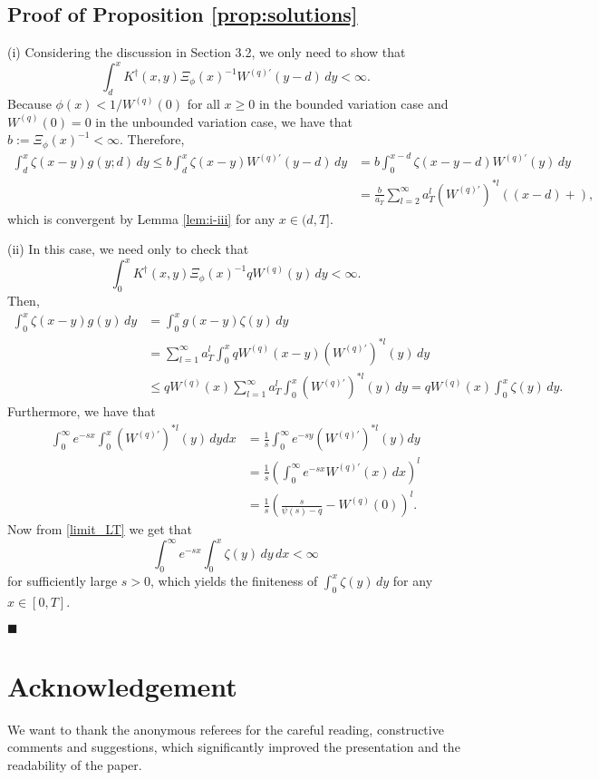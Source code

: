 \documentclass[12pt,reqno]{amsart}
\newcommand{\blue}{\textcolor[rgb]{0.00,0.00,1.00}}
\newcommand{\green}{\textcolor[rgb]{0.00,0.70,.30}}
\theoremstyle{definition}
\theoremstyle{remark}
\begin{document}
\subsection{Proof of Proposition \ref{prop:solutions}}
(i)
Considering the discussion in Section 3.2, we only need to show that$$\int_d^xK^{\dagger}(x,y)\Xi_{\phi}(x)^{-1}W^{(q)\prime}(y-d)\,dy<\infty.$$ 
Because $\phi(x)<1/W^{(q)}(0)$ for all $x\geq0$ in the bounded variation case and $W^{(q)}(0)=0$ in the unbounded variation case, 
we have that $b:=\Xi_{\phi}(x)^{-1}<\infty$. Therefore,
\begin{align*}
\int_d^x \zeta(x-y)g(y;d)\,dy\le b \int_d^x\zeta(x-y){W^{(q)\prime}}(y-d)\,dy&=b\int_0^{x-d}\zeta(x-y-d){W^{(q)\prime}}(y)\,dy\\
&=\frac{b}{a_T}\sum_{l=2}^\infty 
a_T^l(W^{(q)\prime})^{*l}((x-d)+),
\end{align*}
which is convergent by Lemma \ref{lem:i-iii} for any $x\in(d,T]$.\\
\begin{comment}
In the bounded variation case, since $\phi(0+)=0$ {$\phi(x)<1/W^{(q)}(0)$ for all $x>0$?} we have that
$\sup_{y\in [0,T]}\frac{1}{(1-\phi(M)W^{(q)}(0))}=b<\infty$  and therefore 
 $\int_0^x \zeta(x-y)g({y})\,dy\le \int_0^x\zeta(x-y)b{W^{(q)\prime}}(y)\,dy={\frac{b}{a}}\sum_{l=2}^\infty 
a^l(W^{(q)\prime})^{*l}(x)$, where $a$ is defined in \eqref{eq:def_a}, {which is convergent by Lemma
\ref{lem:i-iii}.}
The case of unbounded variation can be treated similarly, since $W^{(q)}(0)=0$.\\
\end{comment}
(ii) In this case, we need only to check that $$\int_0^xK^{\dagger}(x,y)\Xi_{\phi}(x)^{-1}qW^{(q)}(y)\,dy<\infty.$$ 
Then,
\begin{align*}
\int_0^x \zeta(x-y)g(y)\,dy&=\int_0^x g(x-y)\zeta(y)\,dy\\
&=\sum_{l=1}^\infty a_T^l\int_0^x q W^{(q)}(x-y) {(W^{(q)\prime})^{*l}}(y)\,dy 
\\
&\le qW^{(q)}(x)\sum_{l=1}^\infty a_T^l\int_0^x  {(W^{(q)\prime})^{*l}}(y)\,dy=  qW^{(q)}(x)\int_0^x \zeta(y)\,dy.
\end{align*}
Furthermore, we have that
\begin{align*}
\int_0^{\infty}e^{-s x}\int_0^x{(W^{(q)\prime})^{*l}}(y)\,dydx&=\frac{1}{s}\int_0^{\infty}e^{-sy}{(W^{(q)\prime})^{*l}}(y)dy\\
&=\frac{1}{s}\left(\int_0^\infty e^{-sx}{W^{(q)\prime}}(x)\,dx\right)^{l}\\
&=\frac{1}{s}\left(\frac{s}{\psi(s)-q}-W^{(q)}(0)\right)^{l}.
\end{align*}
Now from \eqref{limit_LT} we get that 
$$\int_0^\infty e^{-sx}\int_0^x\zeta(y)\,dy\,dx<\infty$$
for sufficiently large $s>0$, which yields the finiteness of $\int_0^x\zeta(y)\,dy$ for any $x\in[0,T]$.
\begin{flushright}$\blacksquare$\end{flushright}

\section*{Acknowledgement}
We want to thank the anonymous referees for the careful reading, constructive comments and suggestions, which
significantly improved the presentation and the readability of the paper. 



%

\end{document}
